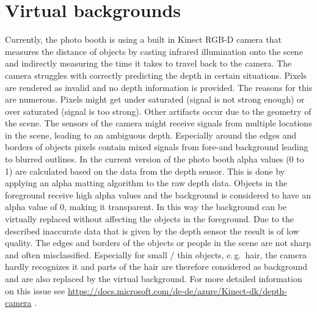 \documentclass[11pt,
  paper=a4, 
  bibliography=totocnumbered,
	captions=tableheading,
	BCOR=10mm
]{scrreprt}
\theoremstyle{definition}
\newcommand{\eg}{e.\,g.~}
\begin{document}
\section{Virtual backgrounds}
Currently, the photo booth is using a built in Kinect RGB-D camera that measures the distance of objects by casting infrared illumination onto the scene and indirectly measuring the time it takes to travel back to the camera. 
The camera struggles with correctly predicting the depth in certain situations. 
Pixels are rendered as invalid and no depth information is provided. 
The reasons for this are numerous. 
Pixels might get under saturated (signal is not strong enough) or over saturated (signal is too strong). 
Other artifacts occur due to the geometry of the scene. 
The sensors of the camera might receive signals from multiple locations in the scene, leading to an ambiguous depth. 
Especially around the edges and borders of objects pixels contain mixed signals from fore-and background leading to blurred outlines.
In the current version of the photo booth alpha values (0 to 1) are calculated based on the data from the depth sensor. 
This is done by applying an alpha matting algorithm \cite{Gastal2010} to the raw depth data.
Objects in the foreground receive high alpha values and the background is considered to have an alpha value of 0, making it transparent. 
In this way the background can be virtually replaced without affecting the objects in the foreground. 
Due to the described inaccurate data that is given by the depth sensor the result is of low quality. 
The edges and borders of the objects or people in the scene are not sharp and often misclassified. 
Especially for small / thin objects, \eg hair, the camera hardly recognizes it and parts of the hair are therefore considered as background and are also replaced by the virtual background.
For more detailed information on this issue see \url{https://docs.microsoft.com/de-de/azure/Kinect-dk/depth-camera} \cite{Microsoft2019}.
\end{document}
